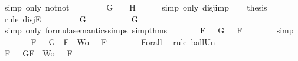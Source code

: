 \begin{isabellebody}
\ {\isacharparenleft}simp\ only{\isacharcolon}\ not{\isacharunderscore}not{\isacharparenright}\isanewline
\ \ \isamarkupfalse%
\ \isamarkupfalse%
\ {\isachardoublequoteopen}{\isacharparenleft}{\isasymnot}\ {\isasymA}\ {\isasymTurnstile}\ G{\isacharparenright}\ {\isasymor}\ {\isasymA}\ {\isasymTurnstile}\ H{\isachardoublequoteclose}\isanewline
\ \ \ \ \isamarkupfalse%
\ {\isacharparenleft}simp\ only{\isacharcolon}\ disj{\isacharunderscore}imp{\isacharparenright}\isanewline
\ \ \isamarkupfalse%
\ {\isacharquery}thesis\isanewline
\ \ \isamarkupfalse%
\ {\isacharparenleft}rule\ disjE{\isacharparenright}\isanewline
\ \ \ \ \isamarkupfalse%
\ {\isachardoublequoteopen}{\isasymnot}\ {\isasymA}\ {\isasymTurnstile}\ G{\isachardoublequoteclose}\isanewline
\ \ \ \ \isamarkupfalse%
\ \isamarkupfalse%
\ {\isachardoublequoteopen}{\isasymA}\ {\isasymTurnstile}\ {\isacharparenleft}\isactrlbold {\isasymnot}\ G{\isacharparenright}{\isachardoublequoteclose}\isanewline
\ \ \ \ \ \ \isamarkupfalse%
\ {\isacharparenleft}simp\ only{\isacharcolon}\ formula{\isacharunderscore}semantics{\isachardot}simps{\isacharparenleft}{}{\isacharparenright}\ simp{\isacharunderscore}thms{\isacharparenleft}{}{\isacharparenright}{\isacharparenright}\isanewline
\ \ \ \ \isamarkupfalse%
\ \isamarkupfalse%
\ {\isachardoublequoteopen}{\isasymforall}F\ {\isasymin}\ {\isacharbraceleft}\isactrlbold {\isasymnot}\ G{\isacharbraceright}{\isachardot}\ {\isasymA}\ {\isasymTurnstile}\ F{\isachardoublequoteclose}\isanewline
\ \ \ \ \ \ \isamarkupfalse%
\ simp\isanewline
\ \ \ \ \isamarkupfalse%
\ \isamarkupfalse%
\ {\isachardoublequoteopen}{\isasymforall}F\ {\isasymin}\ {\isacharparenleft}{\isacharbraceleft}\isactrlbold {\isasymnot}\ G{\isacharbraceright}\ {\isasymunion}\ {\isacharparenleft}{\isacharbraceleft}F{\isacharbraceright}\ {\isasymunion}\ Wo{\isacharparenright}{\isacharparenright}{\isachardot}\ {\isasymA}\ {\isasymTurnstile}\ F{\isachardoublequoteclose}\isanewline
\ \ \ \ \ \ \isamarkupfalse%
\ Forall{}\ \isamarkupfalse%
\ {\isacharparenleft}rule\ ball{\isacharunderscore}Un{\isacharparenright}\isanewline
\ \ \ \ \isamarkupfalse%
\ \isamarkupfalse%
\ {\isachardoublequoteopen}{\isasymforall}F\ {\isasymin}\ {\isacharbraceleft}\isactrlbold {\isasymnot}\ G{\isacharcomma}F{\isacharbraceright}\ {\isasymunion}\ Wo{\isachardot}\ {\isasymA}\ {\isasymTurnstile}\ F{\isachardoublequoteclose}\isanewline

\end{isabellebody}
